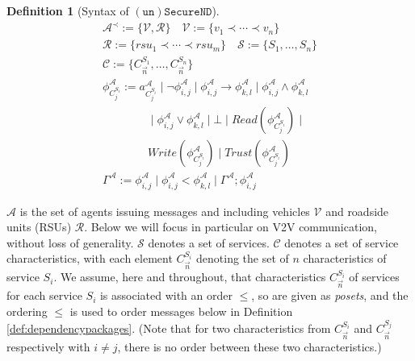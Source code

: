 \documentclass[compsoc, conference, letterpaper, 10pt, times]{IEEEtran}
\newtheorem{definition}{Definition}
\begin{document}
\begin{definition}[Syntax of $\mathtt{(un)SecureND}$]\label{def:syntax} %
	\begin{displaymath}
	\begin{array}{l}
	\mathcal{A}^{\prec}:= \{\mathcal{V, R}\} \quad 
	\mathcal{V}:= \{v_{1}\prec \cdots \prec v_{n}\}\\
	\mathcal{R}:= \{rsu_{1}\prec\cdots \prec rsu_{m}\}\quad \mathcal{S}:= \{S_1, \dots, S_{n}\}\\  %
	\mathcal{C}:= \{C^{S_1}_{\overrightarrow{n}},  \dots, C^{S_{n}}_{\overrightarrow{n}}\}\\  %
	\phi^{\mathcal{A}}_{C^{S_{i}}_{j}}:= a^{\mathcal{A}}_{C^{S_{i}}_{j}}\mid \neg \phi^{\mathcal{A}}_{i,j}\mid \phi^{\mathcal{A}}_{i,j}\rightarrow \phi^{\mathcal{A}}_{k,l}\mid \phi^{\mathcal{A}}_{i,j}\wedge \phi^{\mathcal{A}}_{k,l}\\
	\qquad \qquad \mid \phi^{\mathcal{A}}_{i,j}\vee \phi^{\mathcal{A}}_{k,l} \mid \bot \mid Read(\phi^{\mathcal{A}}_{C^{S_{i}}_{j}})\mid\\ 
	\qquad \qquad Write(\phi^{\mathcal{A}}_{C^{S_{i}}_{j}})\mid Trust(\phi^{\mathcal{A}}_{C^{S_{i}}_{j}})\\
	\Gamma^{\mathcal{A}}:= 
	\phi^{\mathcal{A}}_{i,j} \mid \phi^{\mathcal{A}}_{i,j} < \phi^{\mathcal{A}}_{k,l} \mid \Gamma^{\mathcal{A}}; \phi^{\mathcal{A}}_{i,j}
	
	\end{array}
	\end{displaymath}
\end{definition}
%

$\mathcal{A}$ is the set of agents issuing messages and including vehicles $\mathcal{V}$ and roadside units (RSUs) $\mathcal{R}$. Below we will focus in particular on V2V communication, without loss of generality. $\mathcal{S}$ denotes a set of services. $\mathcal{C}$ denotes a set of service characteristics, with each element $C^{S_i}_{\overrightarrow{n}}$ denoting the set of $n$ characteristics of service $S_{i}$. We assume, here and throughout, that characteristics $C^{S_i}_{\overrightarrow{n}}$ of services for each service $S_i$ is associated with an order $\leq$, so are given as \emph{posets}, and the ordering $\leq$ is used to order messages below in Definition \ref{def:dependencypackages}. (Note that for two characteristics from $C^{S_i}_{\overrightarrow{n}}$ and $C^{S_j}_{\overrightarrow{n}}$ respectively with $i\neq j$, there is no order between  these two characteristics.)
\end{document}
